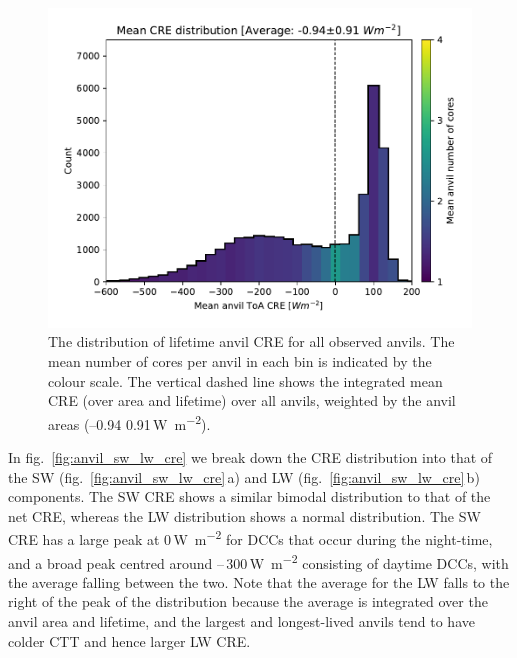 \documentclass[acp, manuscript]{copernicus}
\begin{document}
\begin{figure}[tp]
    \includegraphics[width=12cm]{figures/fig11.pdf}
    \caption[
    The distribution of lifetime anvil CRE for all observed anvils
    ]{
    The distribution of lifetime anvil CRE for all observed anvils. The mean number of cores per anvil in each bin is indicated by the colour scale. The vertical dashed line shows the integrated mean CRE (over area and lifetime) over all anvils, weighted by the anvil areas (--0.94\,\textpm\,0.91\,\unit{W m^{-2}}).
    }
    \label{fig:anvil_cre_dist}
\end{figure}


In fig.~\ref{fig:anvil_sw_lw_cre} we break down the CRE distribution into that of the SW (fig.~\ref{fig:anvil_sw_lw_cre}\,a) and LW (fig.~\ref{fig:anvil_sw_lw_cre}\,b) components. 
The SW CRE shows a similar bimodal distribution to that of the net CRE, whereas the LW distribution shows a normal distribution. 
The SW CRE has a large peak at 0\,\unit{W m^{-2}} for DCCs that occur during the night-time, and a broad peak centred around --\,300\,\unit{W m^{-2}} consisting of daytime DCCs, with the average falling between the two. 
Note that the average for the LW falls to the right of the peak of the distribution because the average is integrated over the anvil area and lifetime, and the largest and longest-lived anvils tend to have colder CTT and hence larger LW CRE.
\end{document}
